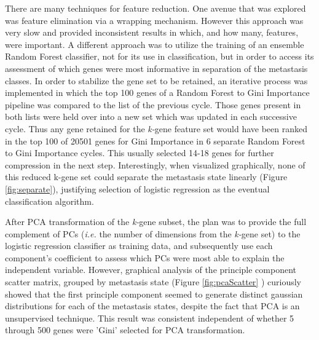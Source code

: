 \documentclass[final]{article}
\begin{document}
There are many techniques for feature reduction.  One avenue that was explored
was feature elimination via a wrapping mechanism.  However this approach was
very slow and provided inconsistent results in which, and how many, features,
were important. A different approach was to utilize the training of an ensemble
Random Forest classifier, not for its use in classification, but in order to
access its assessment of which genes were most informative in separation of the
metastasis classes.  In order to stabilize the gene set to be retained, an
iterative process was implemented in which the top 100 genes of a Random Forest
to Gini Importance pipeline was compared to the list of the previous cycle.
Those genes present in both lists were held over into a new set which was
updated in each successive cycle.  Thus any gene retained for the
\textit{k-}gene feature set would have been ranked in the top 100 of 20501 genes
for Gini Importance in 6 separate Random Forest to Gini Importance cycles.  This
usually selected 14-18 genes for further compression in the next step.
Interestingly, when visualized graphically, none of this reduced k-gene set
could separate the metastasis state linearly (Figure \ref{fig:separate}),
justifying selection of logistic regression as the eventual classification
algorithm.

After PCA transformation of the \textit{k-}gene subset, the plan was to provide
the full complement of PCs (\textit{i.e.} the number of dimensions from the
\textit{k-}gene set) to the logistic regression classifier as training data, and
subsequently use each component's coefficient to  assess which PCs were most able to
explain the independent variable.  However, graphical analysis of the
principle component scatter matrix, grouped by metastasis state (Figure
\ref{fig:pcaScatter} ) curiously showed that the first principle component
seemed to generate distinct gaussian distributions for each of the metastasis
states, despite the fact that PCA is an unsupervised technique.  This result was
consistent independent of whether 5 through 500 genes were 'Gini' selected for
PCA transformation.
\end{document}
